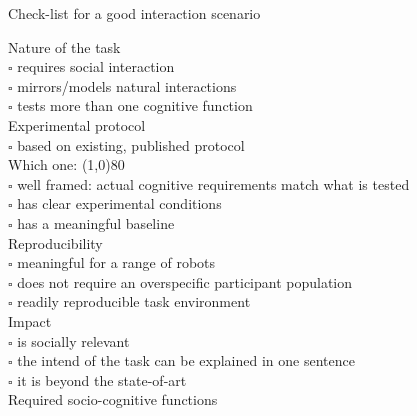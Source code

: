 \documentclass[compress]{beamer}
\begin{document}
\begin{frame}{Check-list for a good interaction scenario}
\scriptsize
    \begin{multicols}{2}

    {\Medium Nature of the task}\\
    $\square$ requires social interaction\\
    $\square$ mirrors/models natural interactions\\
    $\square$ tests more than one cognitive function\\


    {\Medium Experimental protocol}\\
    $\square$ based on existing, published protocol\\
    Which one: \line(1,0){80}\\
    $\square$ well framed: actual cognitive requirements match what is tested\\
    $\square$ has clear experimental conditions\\
    $\square$ has a meaningful baseline\\

    {\Medium Reproducibility}\\
    $\square$ meaningful for a range of robots\\
    $\square$ does not require an overspecific participant population\\
    $\square$ readily reproducible task environment\\

    {\Medium Impact}\\
    $\square$ is socially relevant\\
    $\square$ the intend of the task can be explained in one sentence\\
    $\square$ it is beyond the state-of-art\\

    {\Medium Required socio-cognitive functions}


\end{multicols}
\end{frame}
\end{document}
